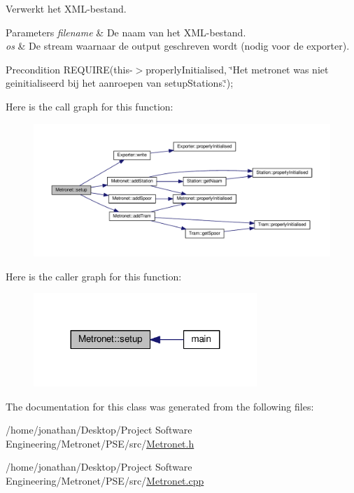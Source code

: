 Verwerkt het X\+M\+L-\/bestand. 


\begin{DoxyParams}{Parameters}
{\em filename} & De naam van het X\+M\+L-\/bestand. \\
\hline
{\em os} & De stream waarnaar de output geschreven wordt (nodig voor de exporter). \\
\hline
\end{DoxyParams}
\begin{DoxyPrecond}{Precondition}
R\+E\+Q\+U\+I\+RE(this-\/$>$properly\+Initialised, \char`\"{}\+Het metronet was niet geinitialiseerd bij het aanroepen van setup\+Stations.\char`\"{}); 
\end{DoxyPrecond}


Here is the call graph for this function\+:\nopagebreak
\begin{figure}[H]
\begin{center}
\leavevmode
\includegraphics[width=350pt]{class_metronet_ad12d6e52c7f5c23d23e87992b4abc1fa_cgraph}
\end{center}
\end{figure}




Here is the caller graph for this function\+:\nopagebreak
\begin{figure}[H]
\begin{center}
\leavevmode
\includegraphics[width=239pt]{class_metronet_ad12d6e52c7f5c23d23e87992b4abc1fa_icgraph}
\end{center}
\end{figure}




The documentation for this class was generated from the following files\+:\begin{DoxyCompactItemize}
\item 
/home/jonathan/\+Desktop/\+Project Software Engineering/\+Metronet/\+P\+S\+E/src/\hyperlink{_metronet_8h}{Metronet.\+h}\item 
/home/jonathan/\+Desktop/\+Project Software Engineering/\+Metronet/\+P\+S\+E/src/\hyperlink{_metronet_8cpp}{Metronet.\+cpp}\end{DoxyCompactItemize}
